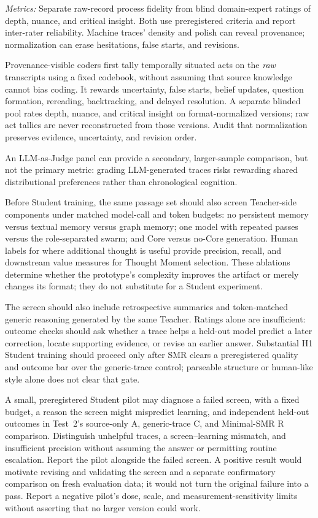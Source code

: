 \documentclass[11pt]{article}
\begin{document}
\emph{Metrics:} Separate raw-record process fidelity from blind domain-expert
ratings of depth, nuance, and critical insight. Both use preregistered criteria
and report inter-rater reliability. Machine traces' density and polish can
reveal provenance; normalization can erase hesitations, false starts, and
revisions.

Provenance-visible coders first tally temporally situated acts on the
\emph{raw} transcripts using a fixed codebook, without assuming that source
knowledge cannot bias coding. It rewards uncertainty, false starts, belief
updates, question formation, rereading, backtracking, and delayed resolution.
A separate blinded pool rates depth, nuance, and critical insight on
format-normalized versions; raw act tallies are never reconstructed from those
versions. Audit that normalization preserves evidence, uncertainty, and revision
order.

An LLM-as-Judge panel can provide a secondary, larger-sample comparison, but
not the primary metric: grading LLM-generated traces risks rewarding shared
distributional preferences rather than chronological cognition.

Before Student training, the same passage set should also screen Teacher-side
components under matched model-call and token budgets: no persistent memory
versus textual memory versus graph memory; one model with repeated passes versus
the role-separated swarm; and Core versus no-Core generation. Human labels for
where additional thought is useful provide precision, recall, and downstream
value measures for Thought Moment selection. These ablations determine whether
the prototype's complexity improves the artifact or merely changes its format;
they do not substitute for a Student experiment.

The screen should also include retrospective summaries and token-matched generic
reasoning generated by the same Teacher. Ratings alone are insufficient:
outcome checks should ask whether a trace helps a held-out model predict a later
correction, locate supporting evidence, or revise an earlier answer. Substantial
H1 Student training should proceed only after SMR clears a preregistered quality
and outcome bar over the generic-trace control; parseable structure or
human-like style alone does not clear that gate.

A small, preregistered Student pilot may diagnose a failed screen, with a fixed
budget, a reason the screen might mispredict learning, and independent held-out
outcomes in Test~2's source-only A, generic-trace C, and Minimal-SMR R
comparison. Distinguish unhelpful traces, a screen--learning mismatch, and
insufficient precision without assuming the answer or permitting routine
escalation. Report the pilot alongside the failed screen. A positive result
would motivate revising and validating the screen and a separate confirmatory
comparison on fresh evaluation data; it would not turn the original failure
into a pass. Report a negative pilot's dose, scale, and measurement-sensitivity
limits without asserting that no larger version could work.
\end{document}
